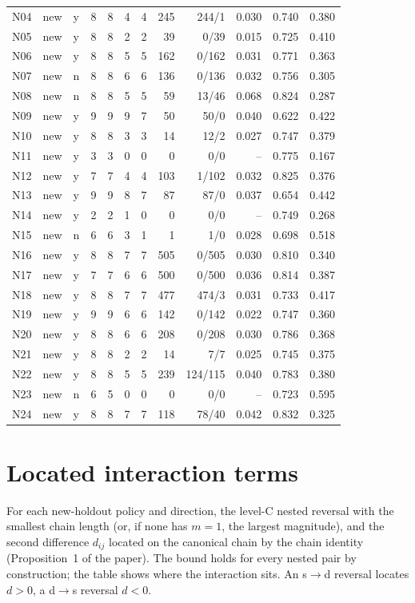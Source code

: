 \documentclass[10pt,a4paper]{article}
\begin{document}
{\begin{longtable}{lllrrrrrrrrr}
N04 & new & y & 8 & 8 & 4 & 4 & 245 & 244/1 & 0.030 & 0.740 & 0.380 \\
N05 & new & y & 8 & 8 & 2 & 2 & 39 & 0/39 & 0.015 & 0.725 & 0.410 \\
N06 & new & y & 8 & 8 & 5 & 5 & 162 & 0/162 & 0.031 & 0.771 & 0.363 \\
N07 & new & n & 8 & 8 & 6 & 6 & 136 & 0/136 & 0.032 & 0.756 & 0.305 \\
N08 & new & n & 8 & 8 & 5 & 5 & 59 & 13/46 & 0.068 & 0.824 & 0.287 \\
N09 & new & y & 9 & 9 & 9 & 7 & 50 & 50/0 & 0.040 & 0.622 & 0.422 \\
N10 & new & y & 8 & 8 & 3 & 3 & 14 & 12/2 & 0.027 & 0.747 & 0.379 \\
N11 & new & y & 3 & 3 & 0 & 0 & 0 & 0/0 & -- & 0.775 & 0.167 \\
N12 & new & y & 7 & 7 & 4 & 4 & 103 & 1/102 & 0.032 & 0.825 & 0.376 \\
N13 & new & y & 9 & 9 & 8 & 7 & 87 & 87/0 & 0.037 & 0.654 & 0.442 \\
N14 & new & y & 2 & 2 & 1 & 0 & 0 & 0/0 & -- & 0.749 & 0.268 \\
N15 & new & n & 6 & 6 & 3 & 1 & 1 & 1/0 & 0.028 & 0.698 & 0.518 \\
N16 & new & y & 8 & 8 & 7 & 7 & 505 & 0/505 & 0.030 & 0.810 & 0.340 \\
N17 & new & y & 7 & 7 & 6 & 6 & 500 & 0/500 & 0.036 & 0.814 & 0.387 \\
N18 & new & y & 8 & 8 & 7 & 7 & 477 & 474/3 & 0.031 & 0.733 & 0.417 \\
N19 & new & y & 9 & 9 & 6 & 6 & 142 & 0/142 & 0.022 & 0.747 & 0.360 \\
N20 & new & y & 8 & 8 & 6 & 6 & 208 & 0/208 & 0.030 & 0.786 & 0.368 \\
N21 & new & y & 8 & 8 & 2 & 2 & 14 & 7/7 & 0.025 & 0.745 & 0.375 \\
N22 & new & y & 8 & 8 & 5 & 5 & 239 & 124/115 & 0.040 & 0.783 & 0.380 \\
N23 & new & n & 6 & 5 & 0 & 0 & 0 & 0/0 & -- & 0.723 & 0.595 \\
N24 & new & y & 8 & 8 & 7 & 7 & 118 & 78/40 & 0.042 & 0.832 & 0.325 \\
\bottomrule
\end{longtable}}


\section{Located interaction terms}
For each new-holdout policy and direction, the level-C nested reversal with the smallest chain length (or, if none has $m=1$, the largest magnitude), and the second difference $d_{ij}$ located on the canonical chain by the chain identity (Proposition~1 of the paper). The bound holds for every nested pair by construction; the table shows where the interaction sits. An s$\to$d reversal locates $d>0$, a d$\to$s reversal $d<0$.
\end{document}
